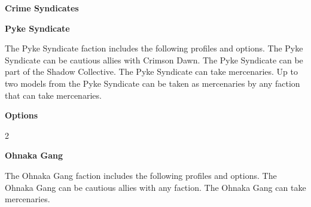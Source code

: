 \documentclass{article}
\begin{document}
{\Huge \textbf{Crime Syndicates}}
\vspace{0.6cm}

{\Large \textbf{Pyke Syndicate}}
\vspace{0.3cm}

\begin{minipage}{19cm}
    The Pyke Syndicate faction includes the following profiles and options.
    The Pyke Syndicate can be cautious allies with Crimson Dawn.
    The Pyke Syndicate can be part of the Shadow Collective.
    The Pyke Syndicate can take mercenaries.
    Up to two models from the Pyke Syndicate can be taken as mercenaries
    by any faction that can take mercenaries.
\end{minipage}

\vspace{0.3cm}
{\scriptsize
\setlength\extrarowheight{1.5pt}

}
\vspace{0.6cm}

{\large \textbf{Options}}
\vspace{0.3cm}
\begin{multicols}{2}
    {\scriptsize

    \setlength\extrarowheight{1.5pt}
    

    \vspace{0.6cm}

    \setlength\extrarowheight{1.5pt}
    

    }
\end{multicols}

{\Large \textbf{Ohnaka Gang}}
\vspace{0.3cm}

\begin{minipage}{19cm}
    The Ohnaka Gang faction includes the following profiles and options.
    The Ohnaka Gang can be cautious allies with any faction.
    The Ohnaka Gang can take mercenaries.
\end{minipage}

\vspace{0.3cm}
{\scriptsize
\setlength\extrarowheight{1.5pt}

}
\vspace{0.6cm}
\end{document}
